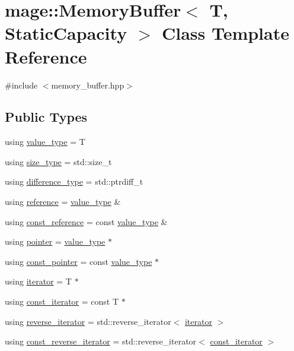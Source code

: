 \hypertarget{classmage_1_1_memory_buffer}{}\section{mage\+:\+:Memory\+Buffer$<$ T, Static\+Capacity $>$ Class Template Reference}
\label{classmage_1_1_memory_buffer}


{\ttfamily \#include $<$memory\+\_\+buffer.\+hpp$>$}

\subsection*{Public Types}
\begin{DoxyCompactItemize}
\item 
using \mbox{\hyperlink{classmage_1_1_memory_buffer_a3f8a036eaa59236b80342ba3a251c9e8}{value\+\_\+type}} = T
\item 
using \mbox{\hyperlink{classmage_1_1_memory_buffer_a77b459da2e6f1c57c21467a6eff8e9f9}{size\+\_\+type}} = std\+::size\+\_\+t
\item 
using \mbox{\hyperlink{classmage_1_1_memory_buffer_a3cb4544fa953bdf88b90f1bf7ef6884a}{difference\+\_\+type}} = std\+::ptrdiff\+\_\+t
\item 
using \mbox{\hyperlink{classmage_1_1_memory_buffer_ad28560f5391baac5dade220c99d9d62b}{reference}} = \mbox{\hyperlink{classmage_1_1_memory_buffer_a3f8a036eaa59236b80342ba3a251c9e8}{value\+\_\+type}} \&
\item 
using \mbox{\hyperlink{classmage_1_1_memory_buffer_aa54883bc0cb483fef570663344f85bb7}{const\+\_\+reference}} = const \mbox{\hyperlink{classmage_1_1_memory_buffer_a3f8a036eaa59236b80342ba3a251c9e8}{value\+\_\+type}} \&
\item 
using \mbox{\hyperlink{classmage_1_1_memory_buffer_a9ca6bfb07bbb3ce91ea703d3d6ec91e3}{pointer}} = \mbox{\hyperlink{classmage_1_1_memory_buffer_a3f8a036eaa59236b80342ba3a251c9e8}{value\+\_\+type}} $\ast$
\item 
using \mbox{\hyperlink{classmage_1_1_memory_buffer_a308c7a4b84c9efbe4bfdc64d545ff6f3}{const\+\_\+pointer}} = const \mbox{\hyperlink{classmage_1_1_memory_buffer_a3f8a036eaa59236b80342ba3a251c9e8}{value\+\_\+type}} $\ast$
\item 
using \mbox{\hyperlink{classmage_1_1_memory_buffer_af487a5f5f07f8ba65e3a5d3a26d32b6c}{iterator}} = T $\ast$
\item 
using \mbox{\hyperlink{classmage_1_1_memory_buffer_a3cc14c15660c36d35195e1836db33ee7}{const\+\_\+iterator}} = const T $\ast$
\item 
using \mbox{\hyperlink{classmage_1_1_memory_buffer_a0ff72cf71e4955a859ed8afd70832c92}{reverse\+\_\+iterator}} = std\+::reverse\+\_\+iterator$<$ \mbox{\hyperlink{classmage_1_1_memory_buffer_af487a5f5f07f8ba65e3a5d3a26d32b6c}{iterator}} $>$
\item 
using \mbox{\hyperlink{classmage_1_1_memory_buffer_a95188e283a195d9aa2730deb6b1c1a79}{const\+\_\+reverse\+\_\+iterator}} = std\+::reverse\+\_\+iterator$<$ \mbox{\hyperlink{classmage_1_1_memory_buffer_a3cc14c15660c36d35195e1836db33ee7}{const\+\_\+iterator}} $>$
\end{DoxyCompactItemize}
